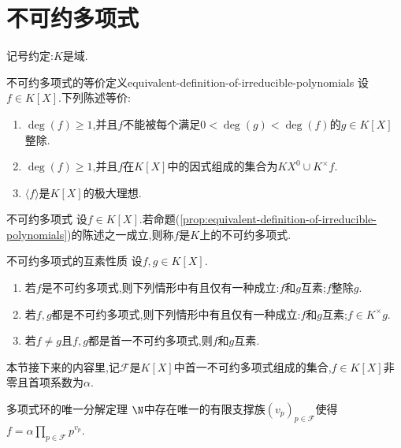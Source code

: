 \section{不可约多项式}

记号约定:$K$是域.

\begin{proposition}{不可约多项式的等价定义}{equivalent-definition-of-irreducible-polynomials}
	设$f\in K\left[X\right]$.下列陈述等价:
	\begin{enumerate}
		\item $\deg\left(f\right)\geq 1$,并且$f$不能被每个满足$0<\deg\left(g\right)<\deg\left(f\right)$的$g\in K\left[X\right]$整除.
		\item $\deg\left(f\right)\geq 1$,并且$f$在$K\left[X\right]$中的因式组成的集合为$KX^{0}\cup K^{\times}f$.
		\item $\langle f\rangle$是$K\left[X\right]$的极大理想.
	\end{enumerate}
\end{proposition}

\begin{definition}{不可约多项式}{}
	设$f\in K\left[X\right]$.若命题(\cref{prop:equivalent-definition-of-irreducible-polynomials})的陈述之一成立,则称$f$是$K$上的不可约多项式.
\end{definition}

\begin{proposition}{不可约多项式的互素性质}{}
	设$f,g\in K\left[X\right]$.
	\begin{enumerate}
		\item 若$f$是不可约多项式,则下列情形中有且仅有一种成立:$f$和$g$互素;$f$整除$g$.
		\item 若$f,g$都是不可约多项式,则下列情形中有且仅有一种成立:$f$和$g$互素;$f\in K^{\times}g$.
		\item 若$f\neq g$且$f,g$都是首一不可约多项式,则$f$和$g$互素.
	\end{enumerate}
\end{proposition}

本节接下来的内容里,记$\mathscr{F}$是$K\left[X\right]$中首一不可约多项式组成的集合,$f\in K\left[X\right]$非零且首项系数为$\alpha$.

\begin{proposition}{多项式环的唯一分解定理}{}
	$\N$中存在唯一的有限支撑族$\left(v_{p}\right)_{p\in\mathscr{F}}$使得$f=\alpha\prod\limits_{p\in\mathscr{F}}p^{v_{p}}$.
\end{proposition}

